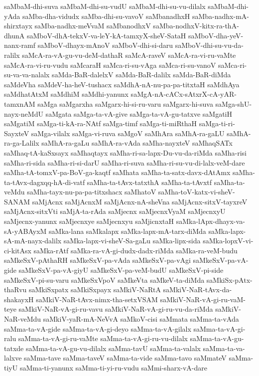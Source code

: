 {saMbaM-dhi-suva
saMbaM-dhi-su-vudU
saMbaM-dhi-su-vu-dilalx
saMbaM-dhi-yAda
saMba-dha-vidudx
saMba-dhi-su-vavoV
saMbanadhxH
saMba-nadhx-mA-shirxtayx
saMba-nadhx-meVvaM
saMbanodhxV
saMba-nodhxV-kitx-ra-thA-dhunA
saMboV-dhA-tekxV-va-leY-kA-tamxyX-sheV-SataH
saMboV-dha-yeV-nanx-ramf
saMboV-dhayx-mAnoV
saMboV-dhi-si-daru
saMboV-dhi-su-vu-da-ralilx
saMcA-ra-vA-gu-vu-deM-dathaR
saMcA-raveV
saMcA-ra-vi-ru-vaMte
saMcA-ra-vi-ru-vudu
saMcaraH
saMca-ri-su-vAga
saMca-ri-su-vanoV
saMca-ri-su-va-va-nalalx
saMda-BaR-dalelxV
saMda-BaR-dalilx
saMda-BaR-diMda
saMdeVha
saMdeV-ha-heV-tushacx
saMdhA-nA-nu-pa-pa-titxtaH
saMdhAya
saMdhatAtxM
saMdhiM
saMdhi-yanunx
saMgA-nA-cACx-sAtxrX-cA-yAR-tamxnAM
saMga
saMgarxha
saMgarx-hi-si-ru-varu
saMgarx-hi-suva
saMga-shU-nayx-neMdU
saMgata
saMga-ta-vA-give
saMga-ta-vA-gu-tatxve
saMgatiH
saMgatiM
saMga-ti-kA-ra-NAtf
saMga-timf
saMga-ti-miRthaH
saMga-ti-ri-SayxteV
saMga-vilalx
saMga-vi-ruva
saMgoV
saMhAra
saMhA-ra-gaLU
saMhA-ra-ga-Lalilx
saMhA-ra-gaLu
saMhA-ra-vAda
saMha-nayxteV
saMhaqSATx
saMhaq-tA-kaSxsayx
saMhaqtayx
saMha-ri-sa-lapx-Du-vu-da-riMda
saMha-risi
saMha-ri-sida
saMha-ri-si-darU
saMha-ri-suva
saMha-ri-su-vu-di-lalx-veM-dare
saMha-tA-tomxV-pa-BoV-ga-kaqtf
saMhata
saMha-ta-satx-davx-dAtAmx
saMha-ta-tAvx-dagxqq-hA-di-vatf
saMha-ta-tAvx-tatxthA
saMha-ta-tAvxtf
saMha-ta-veMdu
saMha-tayx-nu-pa-pa-titxshacx
saMhatoV
saMha-toV-katx-vi-sheV-SANAM
saMjAcnx
saMjAcnxM
saMjAcnx-nA-sheVna
saMjAcnx-sitxV-tayxreV
saMjAcnx-sitxVti
saMjA-ta-rAda
saMjecnx
saMjecnxVyaM
saMjecnxyU
saMjecnx-yanunx
saMjecnxye
saMjecnxyu
saMjicnxtaH
saMka-lApx-dhayx-va-sA-yABAyxM
saMka-lana
saMkalapx
saMka-lapx-mA-tarx-diMda
saMka-lapx-sA-mA-nayx-dalilx
saMka-lapx-vi-sheV-Sa-gaLu
saMka-lipx-sida
saMka-lopxV-vi-ci-kitAsx
saMka-rAtf
saMka-ra-vA-gi-dudx-dadx-riMda
saMka-ra-veM-budu
saMkeSxV-pAthaRH
saMkeSxV-pa-vAda
saMkeSxV-pa-vAgi
saMkeSxV-pa-vA-gide
saMkeSxV-pa-vA-giyU
saMkeSxV-pa-veM-budU
saMkeSxV-pi-side
saMkeSxV-pi-su-varu
saMkeSxVpoV
saMkeVta
saMkeV-ta-diMda
saMkiSx-pAtx-thaRvu
saMkiSxpatx
saMkiSxpayx
saMkiV-NaRtA
saMkiV-NaR-tAvx-da-shakayxH
saMkiV-NaR-tAvx-nimx-tha-setxVSAM
saMkiV-NaR-vA-gi-ru-vaM-teye
saMkiV-NaR-vA-gi-ru-vavu
saMkiV-NaR-vA-gi-ru-vu-da-riMda
saMkiV-NaR-veMdu
saMkiV-yaR-mA-NeVvA
saMkoV-cisi
saMmata
saMma-ta-vAda
saMma-ta-vA-gide
saMma-ta-vA-gi-deyo
saMma-ta-vA-gilalx
saMma-ta-vA-gi-ralu
saMma-ta-vA-gi-ru-vaMte
saMma-ta-vA-gi-ru-vu-dilalx
saMma-ta-vA-gu-tatxde
saMma-ta-vA-gu-vu-dilalx
saMma-tavU
saMma-ta-valalx
saMma-ta-va-lalxve
saMma-tave
saMma-taveV
saMma-ta-vide
saMma-tavo
saMmateV
saMma-tiyU
saMma-ti-yanunx
saMma-ti-yi-ru-vudu
saMmi-sharx-vA-dare
}
